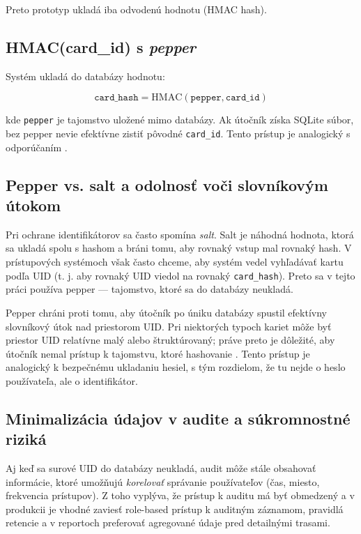 \documentclass[journal,a4paper,onecolumn]{IEEEtran}
\begin{document}
Preto prototyp ukladá iba odvodenú hodnotu (HMAC hash).

\subsection{HMAC(card\_id) s \emph{pepper}}

Systém ukladá do databázy hodnotu:

\begin{equation}
\texttt{card\_hash} = \mathrm{HMAC}(\texttt{pepper}, \texttt{card\_id})
\end{equation}

kde \texttt{pepper} je tajomstvo uložené mimo databázy. Ak útočník získa SQLite súbor, bez pepper nevie efektívne zistiť pôvodné \texttt{card\_id}. Tento prístup je analogický s odporúčaním .

\subsection{Pepper vs. salt a odolnosť voči slovníkovým útokom}

Pri ochrane identifikátorov sa často spomína \emph{salt}. Salt je náhodná hodnota, ktorá sa ukladá spolu s hashom a bráni tomu, aby rovnaký vstup mal rovnaký hash. V prístupových systémoch však často chceme, aby systém vedel vyhľadávať kartu podľa UID (t. j. aby rovnaký UID viedol na rovnaký \texttt{card\_hash}). Preto sa v tejto práci používa pepper — tajomstvo, ktoré sa do databázy neukladá.

Pepper chráni proti tomu, aby útočník po úniku databázy spustil efektívny slovníkový útok nad priestorom UID. Pri niektorých typoch kariet môže byť priestor UID relatívne malý alebo štruktúrovaný; práve preto je dôležité, aby útočník nemal prístup k tajomstvu, ktoré hashovanie . Tento prístup je analogický k bezpečnému ukladaniu hesiel, s tým rozdielom, že tu nejde o heslo používateľa, ale o identifikátor.

\subsection{Minimalizácia údajov v audite a súkromnostné riziká}

Aj keď sa surové UID do databázy neukladá, audit môže stále obsahovať informácie, ktoré umožňujú \emph{korelovať} správanie používateľov (čas, miesto, frekvencia prístupov). Z toho vyplýva, že prístup k auditu má byť obmedzený a v produkcii je vhodné zaviesť role-based prístup k auditným záznamom, pravidlá retencie a v reportoch preferovať agregované údaje pred detailnými trasami.
\end{document}
